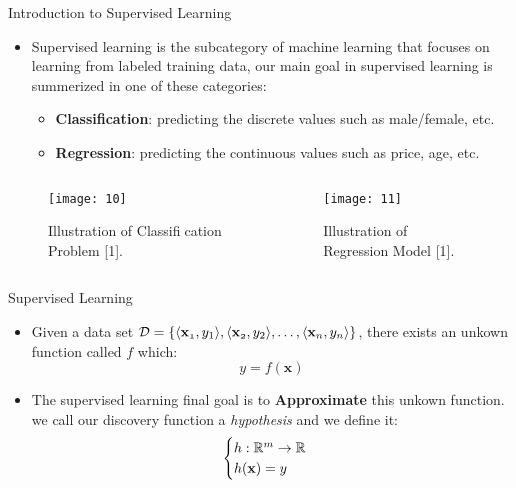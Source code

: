 \documentclass[compress,oilve]{beamer}
\begin{document}
\begin{frame}{Introduction to Supervised Learning}
\begin{itemize}
\item Supervised learning is the subcategory of machine learning that focuses on learning from labeled training data, our main goal in supervised learning is summerized in one of these categories:
\begin{itemize}
\item \textbf{Classification}: predicting the discrete values such as male/female, etc.
\item \textbf{Regression}: predicting the continuous values such as price, age, etc.
\end{itemize}
\end{itemize}
\begin{columns}
\begin{column}{0.5\textwidth}
\begin{figure}
 \centering
 \texttt{[image: 10]}  
 \caption{Illustration of Classification Problem [1].}
\end{figure}
\end{column}
\begin{column}{0.5\textwidth}
\begin{figure}
 \centering
 \texttt{[image: 11]}  
 \caption{Illustration of Regression Model [1].}
\end{figure}
\end{column}
\end{columns}
\end{frame}

\begin{frame}{Supervised Learning}
\begin{itemize}
\item Given a data set $ \mathcal{D} = \{ \langle \mathbf{x_{\mathnormal 1}} , y_{1} \rangle, \langle \mathbf{x_{\mathnormal 2}} , y_{2} \rangle, \dots, \langle \mathbf{x_{\mathnormal n}} , y_{n} \rangle\} $, there exists an unkown function called $ f $ which:
$$ y = f(\mathbf{x})$$
\item The supervised learning final goal is to \textbf{Approximate} this unkown function. we call our discovery function a \textit{hypothesis} and we define it:
$$  \begin{cases}
       h: \mathbb{R^{\mathnormal m}} \rightarrow \mathbb{R} \\
       h(\mathbf{x}) = y  
  \end{cases} $$
\end{itemize}
\end{frame}
\end{document}
